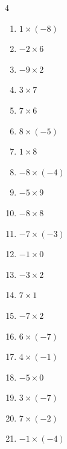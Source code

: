 \begin{multicols}{4}
\begin{enumerate}
  \item $1\times (-8)$
        \phantom{$=-8$}

  \item $-2\times 6$
        \phantom{$=-12$}

  \item $-9\times 2$
        \phantom{$=-18$}

  \item $3\times 7$
        \phantom{$=21$}

  \item $7\times 6$
        \phantom{$=42$}

  \item $8\times (-5)$
        \phantom{$=-40$}

  \item $1\times 8$
        \phantom{$=8$}

  \item $-8\times (-4)$
        \phantom{$=32$}

  \item $-5\times 9$
        \phantom{$=-45$}

  \item $-8\times 8$
        \phantom{$=-64$}

  \item $-7\times (-3)$
        \phantom{$=21$}

  \item $-1\times 0$
        \phantom{$=0$}

  \item $-3\times 2$
        \phantom{$=-6$}

  \item $7\times 1$
        \phantom{$=7$}

  \item $-7\times 2$
        \phantom{$=-14$}

  \item $6\times (-7)$
        \phantom{$=-42$}

  \item $4\times (-1)$
        \phantom{$=-4$}

  \item $-5\times 0$
        \phantom{$=0$}

  \item $3\times (-7)$
        \phantom{$=-21$}

  \item $7\times (-2)$
        \phantom{$=-14$}

  \item $-1\times (-4)$
        \phantom{$=4$}


\end{enumerate}
\end{multicols}
